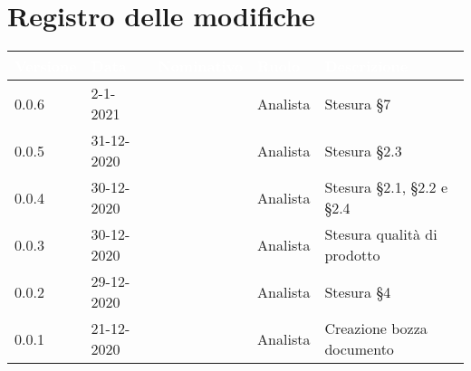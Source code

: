 \section*{Registro delle modifiche}
\setcounter{table}{-1}
{
\renewcommand{\arraystretch}{1.5}
\centering
\begin{longtable}{C{2cm} C{2.5cm} C{3cm} C{2.5cm} C{5cm}}
\textcolor{white}{\textbf{Versione}}&
\textcolor{white}{\textbf{Data}}&
\textcolor{white}{\textbf{Nominativo}}&
\textcolor{white}{\textbf{Ruolo}}&
\textcolor{white}{\textbf{Descrizione}}\\	
\endhead

0.0.6 & 2-1-2021 & \BM{} & Analista & Stesura \S 7 \\
0.0.5 & 31-12-2020 & \BM{} & Analista & Stesura \S 2.3 \\
0.0.4 & 30-12-2020 & \PA{} & Analista & Stesura \S 2.1, \S 2.2 e \S 2.4 \\
0.0.3 & 30-12-2020 & \ZM{} & Analista & Stesura qualità di prodotto\\
0.0.2 & 29-12-2020 & \RA{} & Analista & Stesura \S 4 \\
0.0.1 & 21-12-2020 & \ZM{} & Analista & Creazione bozza documento \\	
\end{longtable}
}
